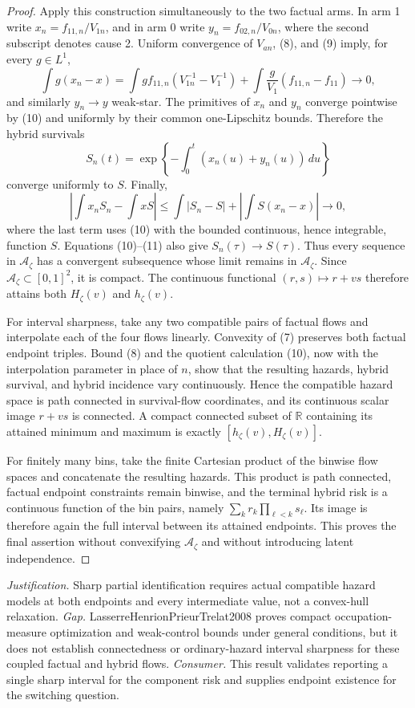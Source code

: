 \documentclass{article}
\begin{document}
\begin{proof}
Apply this construction simultaneously to the two factual arms.  In arm 1 write \(x_n=f_{11,n}/V_{1n}\), and in arm 0 write \(y_n=f_{02,n}/V_{0n}\), where the second subscript denotes cause 2.  Uniform convergence of \(V_{an}\), (8), and (9) imply, for every \(g\in L^1\),
\[
 \int g(x_n-x)
 =\int g f_{11,n}(V_{1n}^{-1}-V_1^{-1})
   +\int \frac{g}{V_1}(f_{11,n}-f_{11})\longrightarrow0,   \tag{10}
\]
and similarly \(y_n\to y\) weak-star.  The primitives of \(x_n\) and \(y_n\) converge pointwise by (10) and uniformly by their common one-Lipschitz bounds.  Therefore the hybrid survivals
\[
 S_n(t)=\exp\!\left\{-\int_0^t(x_n(u)+y_n(u))\,du\right\}
\]
converge uniformly to \(S\).  Finally,
\[
 \left|\int x_nS_n-\int xS\right|
 \le \int|S_n-S|+\left|\int S(x_n-x)\right|\longrightarrow0,  \tag{11}
\]
where the last term uses (10) with the bounded continuous, hence integrable, function \(S\).  Equations (10)--(11) also give \(S_n(\tau)\to S(\tau)\).  Thus every sequence in \(\mathcal A_\zeta\) has a convergent subsequence whose limit remains in \(\mathcal A_\zeta\).  Since \(\mathcal A_\zeta\subset[0,1]^2\), it is compact.  The continuous functional \((r,s)\mapsto r+vs\) therefore attains both \(H_\zeta(v)\) and \(h_\zeta(v)\).

For interval sharpness, take any two compatible pairs of factual flows and interpolate each of the four flows linearly.  Convexity of (7) preserves both factual endpoint triples.  Bound (8) and the quotient calculation (10), now with the interpolation parameter in place of \(n\), show that the resulting hazards, hybrid survival, and hybrid incidence vary continuously.  Hence the compatible hazard space is path connected in survival-flow coordinates, and its continuous scalar image \(r+vs\) is connected.  A compact connected subset of \(\mathbb R\) containing its attained minimum and maximum is exactly \([h_\zeta(v),H_\zeta(v)]\).

For finitely many bins, take the finite Cartesian product of the binwise flow spaces and concatenate the resulting hazards.  This product is path connected, factual endpoint constraints remain binwise, and the terminal hybrid risk is a continuous function of the bin pairs, namely \(\sum_k r_k\prod_{\ell<k}s_\ell\).  Its image is therefore again the full interval between its attained endpoints.  This proves the final assertion without convexifying \(\mathcal A_\zeta\) and without introducing latent independence.
\end{proof}
\par\smallskip\noindent \textit{Justification.} Sharp partial identification requires actual compatible hazard models at both endpoints and every intermediate value, not a convex-hull relaxation. \textit{Gap.} LasserreHenrionPrieurTrelat2008 proves compact occupation-measure optimization and weak-control bounds under general conditions, but it does not establish connectedness or ordinary-hazard interval sharpness for these coupled factual and hybrid flows. \textit{Consumer.} This result validates reporting a single sharp interval for the component risk and supplies endpoint existence for the switching question.
\end{document}
